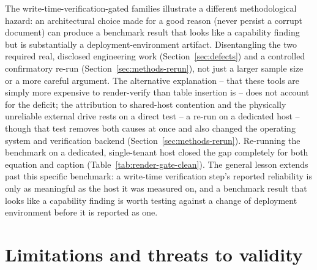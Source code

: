 \documentclass[11pt]{article}
\DeclareRobustCommand{\claim}[2]{#2}
\begin{document}
\claim{verification-confound-reliability-cost}{The write-time-verification-gated families illustrate a different methodological
hazard: \claim{never-persist-corrupt-document}{an architectural choice made for a good reason (never persist a corrupt document)} can
\claim{gap-was-deployment-artifact}{produce a benchmark result that looks like a capability finding but is substantially a
deployment-environment artifact.}} \claim{rerun-is-direct-test}{Disentangling the two required real, disclosed engineering work
(Section~\ref{sec:defects}) and a controlled confirmatory re-run (Section~\ref{sec:methods-rerun}),
not just a larger sample size or a more careful argument.} \claim{render-cost-hypothesis-rejected}{\claim{render-gated-families-slower-vs-no-cost-difference}{The alternative
explanation -- that these tools are simply more expensive to render-verify than table
insertion is -- does not account for the deficit};} \claim{external-drive-unreliable}{\claim{rerun-is-direct-test}{\claim{gap-was-deployment-artifact}{\claim{gap-causes-contention-and-drive}{the attribution to shared-host contention and the
physically unreliable external drive rests on a direct test -- a re-run on a dedicated host --
though that test removes both causes at once and also changed the operating system and
verification backend (Section~\ref{sec:methods-rerun}).}}}} \claim{rerun-closed-gap-completely}{\claim{original-host-two-of-three-depressed}{\claim{rerun-identical-benchmark-dedicated-host}{Re-running
the benchmark on a dedicated, single-tenant host} closed the gap completely for both
equation and caption (Table~\ref{tab:render-gate-clean}).}} The general lesson extends past this
specific benchmark: \claim{verification-confound-reliability-cost}{a write-time verification step's reported reliability is only as meaningful
as the host it was measured on,} and a benchmark result that looks like a capability finding is
worth testing against a change of deployment environment before it is reported as one.

\section{Limitations and threats to validity}
\label{sec:limitations}
\end{document}
